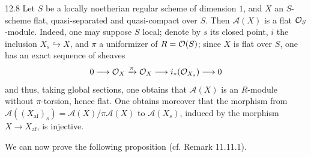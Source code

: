 \begin{remark}{12.8}\label{VIB.12.8}
Let $S$ be a locally noetherian regular scheme of dimension $1$, and $X$ an $S$-scheme flat, quasi-separated and quasi-compact over $S$. Then $\mathscr A(X)$ is a flat $\mathcal{O}_S$-module. Indeed, one may suppose $S$ local; denote by $s$ its closed point, $i$ the inclusion $X_s\hookrightarrow X$, and $\pi$ a uniformizer of $R=\mathcal{O}(S)$; since $X$ is flat over $S$, one has an exact sequence of sheaves
\[
0\longrightarrow\mathcal{O}_X\xrightarrow{\pi}\mathcal{O}_X\longrightarrow i_*(\mathcal{O}_{X_s})\longrightarrow0
\]
and thus, taking global sections, one obtains that $\mathscr A(X)$ is an $R$-module without $\pi$-torsion, hence flat. One obtains moreover that the morphism from $\mathscr A((X_{\mathrm{af}})_s)=\mathscr A(X)/\pi\mathscr A(X)$ to $\mathscr A(X_s)$, induced by the morphism $X\to X_{\mathrm{af}}$, is injective.
\end{remark}
We can now prove the following proposition (cf. Remark 11.11.1).

